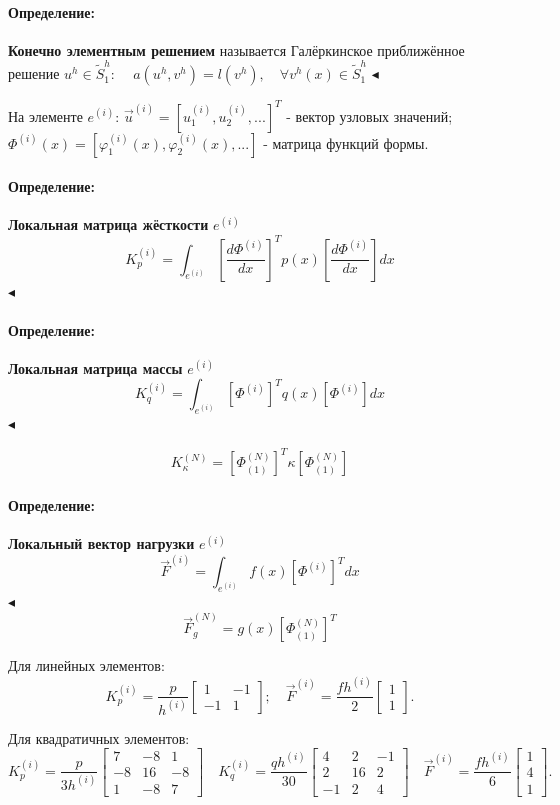 \documentclass{article}
\newenvironment{definition}{ \paragraph{Определение:}}{\hfill $\blacktriangleleft$}
\begin{document}
\begin{definition}
	\textbf{Конечно элементным решением} называется Галёркинское приближённое решение $u^h \in \tilde{S}_1^h $: $\quad a(u^h, v^h) = l(v^h), \quad \forall v^h(x) \in \tilde{S}_1^h $
\end{definition}

\bigskip

На элементе $e^{(i)}$:
$\overrightarrow{u}^{(i)} = [ u_1^{(i)}, u_2^{(i)}, ...]^T$ - вектор узловых значений;
$\Phi^{(i)}(x) = [\varphi_1^{(i)}(x), \varphi_2^{(i)}(x), ...]$ - матрица функций формы.

\begin{definition}
	\textbf{Локальная матрица жёсткости} $e^{(i)}$
	\[
		K_p^{(i)} = \int_{e^{(i)}} \left[ \dfrac{d \Phi^{(i)}}{dx} \right]^T p(x) \left[ \dfrac{d \Phi^{(i)}}{dx} \right] dx
	\]
\end{definition}

\begin{definition}
	\textbf{Локальная матрица массы} $e^{(i)}$
	\[
		K_q^{(i)} = \int_{e^{(i)}} \left[ \Phi^{(i)} \right]^T q(x) \left[ \Phi^{(i)} \right] dx
	\]
\end{definition}

\[
	K_{\kappa}^{(N)} = \left[ \Phi_{(1)}^{(N)} \right]^T \kappa \left[ \Phi_{(1)}^{(N)} \right]
\]

\begin{definition}
	\textbf{Локальный вектор нагрузки} $e^{(i)}$
	\[
		\overrightarrow{F}^{(i)} = \int_{e^{(i)}} f(x) \left[ \Phi^{(i)} \right]^T dx
	\]
\end{definition}
\[
	\overrightarrow{F}_{g}^{(N)} = g(x) \left[ \Phi_{(1)}^{(N)} \right]^T
\]

Для линейных элементов:
\[
K_p^{(i)} = \dfrac{p}{h^{(i)}}
\begin{bmatrix}
1 & -1\\
-1&  1
\end{bmatrix};
\quad
\overrightarrow{F}^{(i)}  = \dfrac{f h^{(i)} }{2} 
\begin{bmatrix}
1\\
1
\end{bmatrix}.
\]

Для квадратичных элементов:
\[
K_p^{(i)} = \dfrac{p }{3h^{(i)}}
\begin{bmatrix}
7 & -8 & 1\\
-8 & 16 & -8\\
1 & -8 & 7
\end{bmatrix}
\quad
K_q^{(i)} = \dfrac{q h^{(i)}}{30}
\begin{bmatrix}
4 & 2 & -1\\
2 & 16 & 2\\
-1 & 2 & 4
\end{bmatrix}
\quad
\overrightarrow{F}^{(i)}  = \dfrac{f h^{(i)} }{6} 
\begin{bmatrix}
1\\
4\\
1
\end{bmatrix}.
\]
\end{document}
